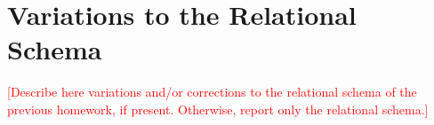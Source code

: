 \section{Variations to the Relational Schema}
\textcolor{red}{[Describe here variations and/or corrections to the relational schema of the previous homework, if present. Otherwise, report only the relational schema.]}